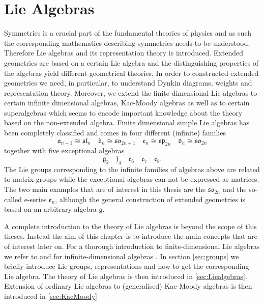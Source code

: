 \chapter{Lie Algebras}\label{chap:symmetries}
Symmetries is a crucial part of the fundamental theories of physics and as such the corresponding mathematics describing symmetries needs to be understood. Therefore Lie algebras and its representation theory is introduced. Extended geometries are based on a certain Lie algebra and the distinguishing properties of the algebras yield different geometrical theories. In order to constructed extended geometries we need, in particular, to understand Dynkin diagrams, weights and representation theory. Moreover, we extend the finite dimensional Lie algebras to certain infinite dimensional algebras, Kac-Moody algebras as well as to certain superalgebras which seems to encode important knowledge about the theory based on the non-extended algebra. 
Finite dimensional simple Lie algebras has been completely classified and comes in four different (infinite) families 
\begin{equation*}
    \mathfrak{a}_{n-1} \cong \mathfrak{sl}_{n}\quad \mathfrak{b}_{n}\cong \mathfrak{so}_{2n+1}\quad \mathfrak{c}_{n} \cong \mathfrak{sp}_{2n}\quad \mathfrak{d}_{n}\cong \mathfrak{so}_{2n} 
\end{equation*}
together with five exceptional algebras 
\begin{equation*}
    \mathfrak{g}_2\quad \mathfrak{f}_4 \quad \mathfrak{e_6} \quad \mathfrak{e_7} \quad \mathfrak{e_8}.
\end{equation*}
The Lie groups corresponding to the infinite families of algebras above are related to matrix groups while the exceptional algebras can not be expressed as matrices. The two main examples that are of interest in this thesis are the $\mathfrak{so}_{2n}$ and the so-called e-series $\mathfrak{e}_n$, although the general construction of extended geometries is based on an arbitrary algebra $\mathfrak{g}$. 

A complete introduction to the theory of Lie algebras is beyond the scope of this theses. Instead the aim of this chapter is to introduce the main concepts that are of interest later on. For a thorough introduction to finite-dimensional Lie algebras we refer to \cite{Fuchs1997,FultonHarris2004} and for infinite-dimensional algebras \cite{Kac1990}. In section \ref{sec:groups} we briefly introduce Lie groups, representations and how to get the corresponding Lie algebra. The theory of Lie algebras is then introduced in \ref{sec:Liealgebras}. Extension of ordinary Lie algebras to (generalised) Kac-Moody algebras is then introduced in \ref{sec:KacMoody}



